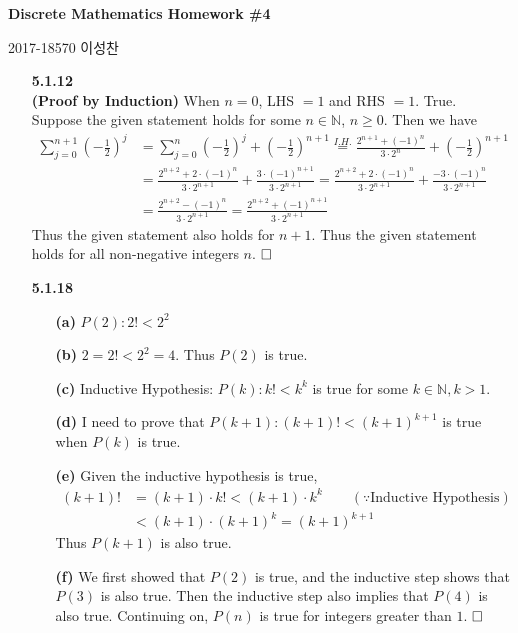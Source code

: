\documentclass{article}
\newcommand*{\qed}{\hfill\ensuremath{\square\\}}%
\begin{document}
\begin{center}
\textbf{\Large Discrete Mathematics Homework \#4}
\end{center}
\begin{flushright}
{\large 2017-18570 이성찬}\\
\end{flushright}

\begin{itemize}
\item[\large \textbf{5.1.12}] ~\\
\textbf{(Proof by Induction)} When \(n = 0\), LHS \(= 1\) and RHS \(= 1\). True. \\ Suppose the given statement holds for some \(n \in \mathbb{N}\), \(n \geq 0\). Then we have
\begin{equation*}
\begin{aligned}
\sum_{j=0}^{n+1} \left(-\frac{1}{2}\right)^j 
&= \sum_{j=0}^{n} \left(-\frac{1}{2}\right)^j + \left(-\frac{1}{2}\right)^{n+1} \overset{I.H.}{=} \frac{2^{n+1}+(-1)^n}{3\cdot 2^n} + \left(-\frac{1}{2}\right)^{n+1} \\
&= \frac{2^{n+2}+2\cdot (-1)^n}{3\cdot 2^{n+1}}+\frac{3\cdot (-1)^{n+1}}{3\cdot 2^{n+1}} = \frac{2^{n+2}+2\cdot (-1)^n}{3\cdot 2^{n+1}}+\frac{-3\cdot (-1)^{n}}{3\cdot 2^{n+1}} \\
&=\frac{2^{n+2}-(-1)^n}{3\cdot 2^{n+1}} = \frac{2^{n+2}+(-1)^{n+1}}{3\cdot 2^{n+1}} 
\end{aligned}
\end{equation*}
Thus the given statement also holds for \(n+1\). Thus the given statement holds for all non-negative integers \(n\). \qed

\item[\large \textbf{5.1.18}] ~
	\begin{enumerate}
		\item[\textbf{(a)}] \(P(2): 2! < 2^2\)
		\item[\textbf{(b)}] \(2 = 2! < 2^2 = 4\). Thus \(P(2)\) is true.
		\item[\textbf{(c)}] Inductive Hypothesis: \(P(k): k! < k^k\) is true for some \(k\in \mathbb{N}, k > 1\).
		\item[\textbf{(d)}] I need to prove that \(P(k+1): (k+1)! < (k+1)^{k+1}\) is true when \(P(k)\) is true.   
		\item[\textbf{(e)}] Given the inductive hypothesis is true,
			\[
			\begin{aligned}
				(k+1)! &= (k+1)\cdot k! < (k+1) \cdot k^k \qquad (\because \text{Inductive Hypothesis}) \\
				&<(k+1) \cdot (k+1)^k = (k+1)^{k+1}
			\end{aligned}
			\]
			Thus \(P(k+1)\) is also true.
		\item[\textbf{(f)}] 	We first showed that \(P(2)\) is true, and the inductive step shows that \(P(3)\) is also true. Then the inductive step also implies that \(P(4)\) is also true. Continuing on, \(P(n)\) is true for integers greater than \(1\). \qed
	\end{enumerate}
	

\end{itemize}
\end{document}
